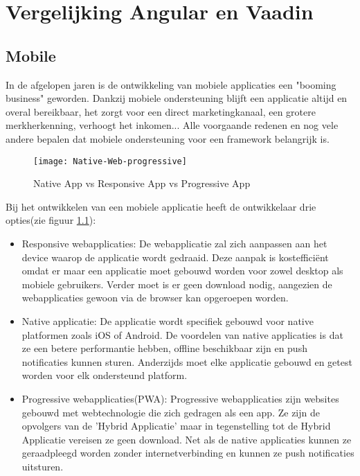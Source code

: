 \chapter{Vergelijking Angular en Vaadin}
\label{ch:angular}
\section{Mobile}
In de afgelopen jaren is de ontwikkeling van mobiele applicaties een "booming business" geworden. Dankzij mobiele ondersteuning blijft een applicatie altijd en overal bereikbaar, het zorgt voor een direct marketingkanaal, een grotere merkherkenning, verhoogt het inkomen... Alle voorgaande redenen en nog vele andere bepalen dat mobiele ondersteuning voor een framework belangrijk is.

\begin{figure}[H]
	\centering
	\texttt{[image: Native-Web-progressive]}
	\caption{Native App vs Responsive App vs Progressive App \autocite{Solis2018}}
	\label{fig:native-responsive-web}
\end{figure}
Bij het ontwikkelen van een mobiele applicatie heeft de ontwikkelaar drie opties(zie figuur \ref{fig:native-responsive-web}):
\begin{itemize}
	\item Responsive webapplicaties: De webapplicatie zal zich aanpassen aan het device waarop de applicatie wordt gedraaid. Deze aanpak is kostefficiënt omdat er maar een applicatie moet gebouwd worden voor zowel desktop als mobiele gebruikers. Verder moet is er geen download nodig, aangezien de webapplicaties gewoon via de browser kan opgeroepen worden.
	\item Native applicatie: De applicatie wordt specifiek gebouwd voor native platformen zoals iOS of Android. De voordelen van native applicaties is dat ze een betere performantie hebben, offline beschikbaar zijn en push notificaties kunnen sturen. Anderzijds moet elke applicatie gebouwd en getest worden voor elk ondersteund platform.
	\item Progressive webapplicaties(PWA):  Progressive webapplicaties zijn websites gebouwd met webtechnologie die zich gedragen als een app. Ze zijn de opvolgers van de 'Hybrid Applicatie' maar in tegenstelling tot de Hybrid Applicatie vereisen ze geen download. Net als de native applicaties kunnen ze geraadpleegd worden zonder internetverbinding en kunnen ze push notificaties uitsturen. 
\end{itemize}


